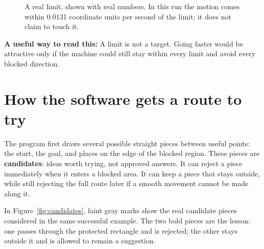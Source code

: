 \documentclass[10pt,letterpaper]{article}
\newcommand{\key}[1]{\textbf{#1}}
\newcommand{\teachingnote}[1]{\begin{center}\begin{minipage}{.88\linewidth}\colorbox{papergray}{\parbox{.94\linewidth}{\small\textbf{A useful way to read this:} #1}}\end{minipage}\end{center}}
\begin{document}
\begin{figure}[ht]
\centering
{}
\caption{A real limit, shown with real numbers. In this run the motion comes
within 0.0131 coordinate units per second of the limit; it does not claim to touch it.}
\label{fig:speed}
\end{figure}

\teachingnote{A limit is not a target. Going faster would be attractive only if
the machine could still stay within every limit and avoid every blocked direction.}

\clearpage

\section{How the software gets a route to try}

The program first draws several possible straight pieces between useful points:
the start, the goal, and places on the edge of the blocked region. These pieces
are \key{candidates}: ideas worth trying, not approved answers. It can reject a
piece immediately when it enters a blocked area. It can keep a piece that stays
outside, while still rejecting the full route later if a smooth movement cannot
be made along it.

In Figure~\ref{fig:candidates}, faint gray marks show the real candidate pieces
considered in the same successful example. The two bold pieces are the lesson:
one passes through the protected rectangle and is rejected; the other stays
outside it and is allowed to remain a suggestion.
\end{document}
